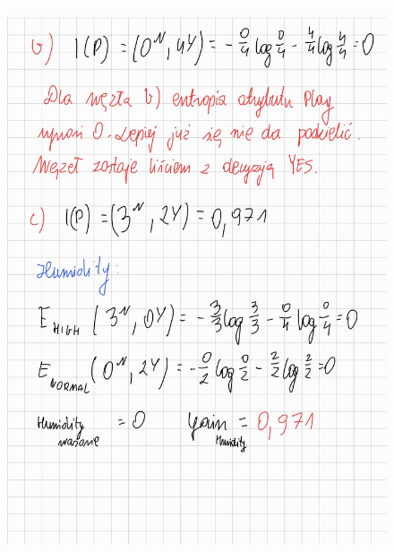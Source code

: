 \documentclass{article}
\begin{document}
\begin{figure}[H]
    \centering
    \includegraphics[width=\textwidth]{tree6.jpg}
\end{figure}
\end{document}
